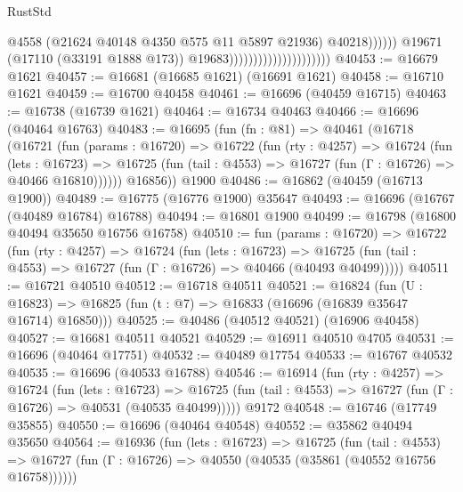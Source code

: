\begin{lexlean}{RustStd}
\begin{coremodule}
                                                          @4558
                                                          (@21624
                                                            @40148
                                                            @4350
                                                            @575
                                                            @11
                                                            @5897
                                                            @21936)
                                                          @40218))))))
                                              @19671
                                              (@17110 (@33191 @1888 @173))
                                              @19683)))))))))))))))))))))
@40453 := @16679 @1621
@40457 := @16681 (@16685 @1621) (@16691 @1621)
@40458 := @16710 @1621
@40459 := @16700 @40458
@40461 := @16696 (@40459 @16715)
@40463 := @16738 (@16739 @1621)
@40464 := @16734 @40463
@40466 := @16696 (@40464 @16763)
@40483 := @16695
    (fun (fn : @81) =>
    @40461
      (@16718
        (@16721
          (fun (params : @16720) =>
          @16722
            (fun (rty : @4257) =>
            @16724
              (fun (lets : @16723) =>
              @16725 (fun (tail : @4553) => @16727 (fun (Γ : @16726) => @40466 @16810))))))
        @16856))
    @1900
@40486 := @16862 (@40459 (@16713 @1900))
@40489 := @16775 (@16776 @1900) @35647
@40493 := @16696 (@16767 (@40489 @16784) @16788)
@40494 := @16801 @1900
@40499 := @16798 (@16800 @40494 @35650 @16756 @16758)
@40510 := fun (params : @16720) =>
  @16722
    (fun (rty : @4257) =>
    @16724
      (fun (lets : @16723) =>
      @16725 (fun (tail : @4553) => @16727 (fun (Γ : @16726) => @40466 (@40493 @40499)))))
@40511 := @16721 @40510
@40512 := @16718 @40511
@40521 := @16824
    (fun (U : @16823) => @16825 (fun (t : @7) => @16833 (@16696 (@16839 @35647 @16714) @16850)))
@40525 := @40486 (@40512 @40521) (@16906 @40458)
@40527 := @16681 @40511 @40521
@40529 := @16911 @40510 @4705
@40531 := @16696 (@40464 @17751)
@40532 := @40489 @17754
@40533 := @16767 @40532
@40535 := @16696 (@40533 @16788)
@40546 := @16914
    (fun (rty : @4257) =>
    @16724
      (fun (lets : @16723) =>
      @16725 (fun (tail : @4553) => @16727 (fun (Γ : @16726) => @40531 (@40535 @40499)))))
    @9172
@40548 := @16746 (@17749 @35855)
@40550 := @16696 (@40464 @40548)
@40552 := @35862 @40494 @35650
@40564 := @16936
    (fun (lets : @16723) =>
    @16725
      (fun (tail : @4553) =>
      @16727 (fun (Γ : @16726) => @40550 (@40535 (@35861 (@40552 @16756 @16758))))))

\end{coremodule}
\end{lexlean}
